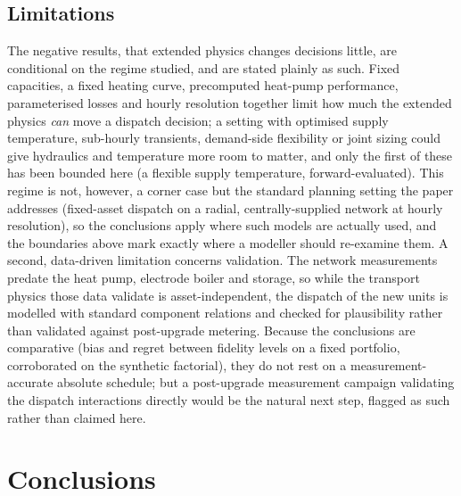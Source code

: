 \documentclass[a4paper,fleqn]{cas-sc}
\newcommand{\new}[1]{\textcolor[HTML]{1A5FB4}{#1}}   %
\newcommand{\new}[1]{#1}
\begin{document}
\subsection{Limitations}
The negative results, that extended physics changes decisions little, are conditional on
the regime studied, and are stated plainly as such. Fixed capacities, a fixed heating curve,
precomputed heat-pump performance, parameterised losses and hourly resolution together limit how
much the extended physics \emph{can} move a dispatch decision; a setting with optimised supply
temperature, sub-hourly transients, demand-side flexibility or joint sizing could give hydraulics
and temperature more room to matter, and only the first of these has been bounded here (a flexible
supply temperature, forward-evaluated). This regime is not, however, a corner case
but the standard planning setting the paper addresses (fixed-asset dispatch on a radial,
centrally-supplied network at hourly resolution), so the conclusions apply where such models are
actually used, and the boundaries above mark exactly where a modeller should re-examine them.
A second, data-driven limitation concerns validation. The network measurements predate the heat
pump, electrode boiler and storage, so while the transport physics those data validate is
asset-independent, the dispatch of the new units is modelled with standard component relations
and checked for plausibility rather than validated against post-upgrade metering. Because the
conclusions are comparative (bias and regret between fidelity levels on a fixed portfolio,
corroborated on the synthetic factorial), they do not rest on a measurement-accurate absolute
schedule; but a post-upgrade measurement campaign validating the dispatch interactions directly
would be the natural next step, flagged as such rather than claimed here.
\new{}

\section{Conclusions}\label{sec:conclusion}
\new{}
\end{document}
